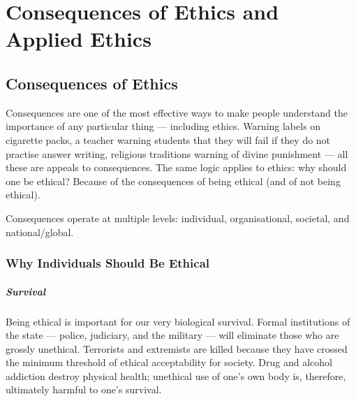 
\chapter{Consequences of Ethics and Applied Ethics}

\vspace{14pt}

\section{Consequences of Ethics}

Consequences are one of the most effective ways to make people understand the importance of any particular thing --- including ethics. Warning labels on cigarette packs, a teacher warning students that they will fail if they do not practise answer writing, religious traditions warning of divine punishment --- all these are appeals to consequences. The same logic applies to ethics: why should one be ethical? Because of the consequences of being ethical (and of not being ethical).

Consequences operate at multiple levels: individual, organisational, societal, and national/global.

\subsection{Why Individuals Should Be Ethical}

\paragraph{Survival} Being ethical is important for our very biological survival. Formal institutions of the state --- police, judiciary, and the military --- will eliminate those who are grossly unethical. Terrorists and extremists are killed because they have crossed the minimum threshold of ethical acceptability for society. Drug and alcohol addiction destroy physical health; unethical use of one's own body is, therefore, ultimately harmful to one's survival.

